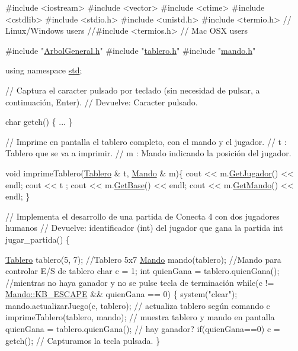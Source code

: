 \begin{DoxyCode}
\textcolor{preprocessor}{#include <iostream>}
\textcolor{preprocessor}{#include <vector>}
\textcolor{preprocessor}{#include <ctime>}
\textcolor{preprocessor}{#include <cstdlib>}
\textcolor{preprocessor}{#include <stdio.h>}
\textcolor{preprocessor}{#include <unistd.h>}
\textcolor{preprocessor}{#include <termio.h>}         \textcolor{comment}{// Linux/Windows users}
\textcolor{comment}{//#include <termios.h>      // Mac OSX users}

\textcolor{preprocessor}{#include "\hyperlink{ArbolGeneral_8h}{ArbolGeneral.h}"}
\textcolor{preprocessor}{#include "\hyperlink{tablero_8h}{tablero.h}"}
\textcolor{preprocessor}{#include "\hyperlink{mando_8h}{mando.h}"}

\textcolor{keyword}{using namespace }\hyperlink{namespacestd}{std};

\textcolor{comment}{// Captura el caracter pulsado por teclado (sin necesidad de pulsar, a continuación, Enter).}
\textcolor{comment}{// Devuelve: Caracter pulsado.}

\textcolor{keywordtype}{char} getch() \{
 ...
\}

\textcolor{comment}{// Imprime en pantalla el tablero completo, con el mando y el jugador.}
\textcolor{comment}{// t : Tablero que se va a imprimir.}
\textcolor{comment}{// m : Mando indicando la posición del jugador.}

\textcolor{keywordtype}{void} imprimeTablero(\hyperlink{classTablero}{Tablero} & t, \hyperlink{classMando}{Mando} & m)\{
    cout << m.\hyperlink{classMando_aaf8c918ecbce5c8173fcf40e04c8b0b7}{GetJugador}() << endl;
    cout << t ;
    cout << m.\hyperlink{classMando_abcc813b0881e56ed976eea2ce6b7fd12}{GetBase}() << endl;
    cout << m.\hyperlink{classMando_a7e02a04343208f949a88e720ba63a281}{GetMando}() << endl;
\}


\textcolor{comment}{// Implementa el desarrollo de una partida de Conecta 4 con dos jugadores humanos}
\textcolor{comment}{// Devuelve: identificador (int) del jugador que gana la partida}
\textcolor{keywordtype}{int} jugar\_partida() \{

    \hyperlink{classTablero}{Tablero} tablero(5, 7);      \textcolor{comment}{//Tablero 5x7}
    \hyperlink{classMando}{Mando} mando(tablero);       \textcolor{comment}{//Mando para controlar E/S de tablero}
    \textcolor{keywordtype}{char} c = 1;
    \textcolor{keywordtype}{int} quienGana = tablero.quienGana();
    \textcolor{comment}{//mientras no haya ganador y no se pulse tecla de terminación}
    \textcolor{keywordflow}{while}(c != \hyperlink{classMando_a3c4e7465d5b25fcaf8f3b50b444421a3}{Mando::KB\_ESCAPE} && quienGana == 0) \{
        system(\textcolor{stringliteral}{"clear"});
        mando.actualizarJuego(c, tablero);  \textcolor{comment}{// actualiza tablero según comando c }
        imprimeTablero(tablero, mando);     \textcolor{comment}{// muestra tablero y mando en pantalla}
        quienGana = tablero.quienGana();    \textcolor{comment}{// hay ganador?}
        \textcolor{keywordflow}{if}(quienGana==0) c = getch();       \textcolor{comment}{// Capturamos la tecla pulsada.    }
    \}


\end{DoxyCode}
